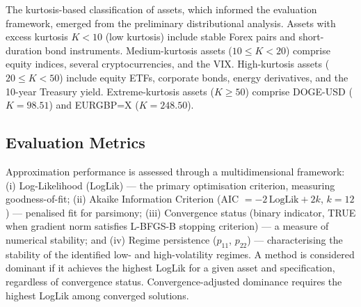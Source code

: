 \documentclass[12pt, a4paper]{article}
\begin{document}
The kurtosis-based classification of assets, which informed the evaluation framework, emerged from the preliminary distributional analysis. Assets with excess kurtosis $K < 10$ (low kurtosis) include stable Forex pairs and short-duration bond instruments. Medium-kurtosis assets ($10 \le K < 20$) comprise equity indices, several cryptocurrencies, and the VIX. High-kurtosis assets ($20 \le K < 50$) include equity ETFs, corporate bonds, energy derivatives, and the 10-year Treasury yield. Extreme-kurtosis assets ($K \ge 50$) comprise DOGE-USD ($K = 98.51$) and EURGBP=X ($K = 248.50$).

\subsection{Evaluation Metrics}

Approximation performance is assessed through a multidimensional framework: (i) Log-Likelihood (LogLik) — the primary optimisation criterion, measuring goodness-of-fit; (ii) Akaike Information Criterion (AIC $= -2\,\text{LogLik} + 2k$, $k = 12$) — penalised fit for parsimony; (iii) Convergence status (binary indicator, TRUE when gradient norm satisfies L-BFGS-B stopping criterion) — a measure of numerical stability; and (iv) Regime persistence ($p_{11}$, $p_{22}$) — characterising the stability of the identified low- and high-volatility regimes. A method is considered dominant if it achieves the highest LogLik for a given asset and specification, regardless of convergence status. Convergence-adjusted dominance requires the highest LogLik among converged solutions.
\end{document}

